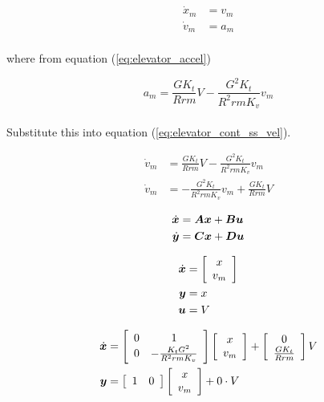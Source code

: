\begin{align}
  \dot{x}_m &= v_m \label{eq:elevator_cont_ss_pos} \\
  \dot{v}_m &= a_m \label{eq:elevator_cont_ss_vel}
\end{align}
\\
where from equation (\ref{eq:elevator_accel})

\begin{equation*}
  a_m = \frac{GK_t}{Rrm} V - \frac{G^2 K_t}{R^2 rm K_v} v_m
\end{equation*}
\\
Substitute this into equation (\ref{eq:elevator_cont_ss_vel}).

\begin{align}
  \dot{v}_m &= \frac{GK_t}{Rrm} V - \frac{G^2 K_t}{R^2 rm K_v} v_m \nonumber \\
  \dot{v}_m &= -\frac{G^2 K_t}{R^2 rm K_v} v_m + \frac{GK_t}{Rrm} V
\end{align}

\begin{align*}
  \dot{\bm x} &= \bm A \bm x + \bm B \bm u \\
  \dot{\bm y} &= \bm C \bm x + \bm D \bm u
\end{align*}

\begin{align*}
  \dot{\bm x} &= \left[
  \begin{array}{c}
    x \\
    v_m
  \end{array}
  \right] \\
  \bm y &= x \\
  \bm u &= V
\end{align*}

\begin{align}
  \dot{\bm x} &= \left[
  \begin{array}{cc}
    0 & 1 \\
    0 & -\frac{K_t G^2}{R^2rmK_v}
  \end{array}
  \right] \left[
  \begin{array}{c}
    x \\
    v_m \\
  \end{array}
  \right] + \left[
  \begin{array}{c}
    0 \\
    \frac{GK_t}{Rrm}
  \end{array}
  \right] V \\
  \bm y &= \left[
  \begin{array}{cc}
    1 & 0
  \end{array}
  \right] \left[
  \begin{array}{c}
    x \\
    v_m \\
  \end{array}
  \right] + 0 \cdot V
\end{align}

